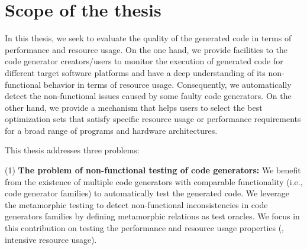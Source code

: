 



\section{Scope of the thesis}

In this thesis, we seek to evaluate the quality of the generated code in terms of performance and resource usage.
On the one hand, we provide facilities to the code generator creators/users to monitor the execution of generated code for different target software platforms and have a deep understanding of its non-functional behavior in terms of resource usage. Consequently, we automatically detect the non-functional issues caused by some faulty code generators. 
On the other hand, we provide a mechanism that helps users to select the best optimization sets that satisfy specific resource usage or performance requirements for a broad range of programs and hardware architectures.

This thesis addresses three problems: 
	
	(1) \textbf{The problem of non-functional testing of code generators:} We benefit from the existence of multiple code generators with comparable functionality (i.e., code generator families) to automatically test the generated code. We leverage the metamorphic testing to detect non-functional inconsistencies in code generators families by defining metamorphic relations as test oracles. 
	We focus in this contribution on testing the performance and resource usage properties (\eg, intensive resource usage).
	
